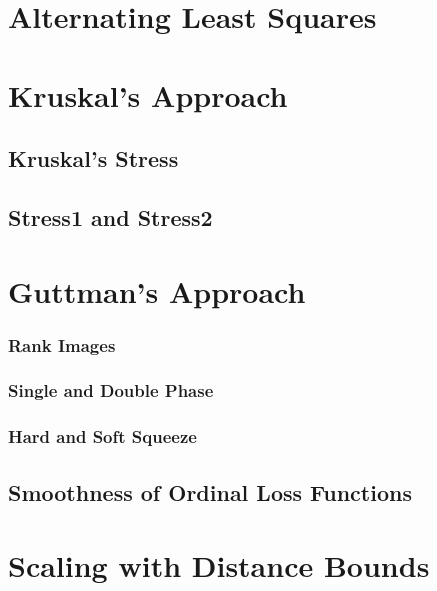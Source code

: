 \documentclass[
  12pt,
]{book}
\begin{document}
\section{Alternating Least Squares}\label{nmdsals}

\section{Kruskal's Approach}\label{nmdskruskal}

\subsection{Kruskal's Stress}\label{kruskals-stress-2}

\subsection{Stress1 and Stress2}\label{stress1-and-stress2}

\section{Guttman's Approach}\label{nmdsguttman}

\subsubsection{Rank Images}\label{rank-images}

\subsubsection{Single and Double Phase}\label{single-and-double-phase}

\subsubsection{Hard and Soft Squeeze}\label{hard-and-soft-squeeze}

\subsection{Smoothness of Ordinal Loss Functions}\label{smoothness-of-ordinal-loss-functions}

\section{Scaling with Distance Bounds}\label{scaling-with-distance-bounds}
\end{document}
